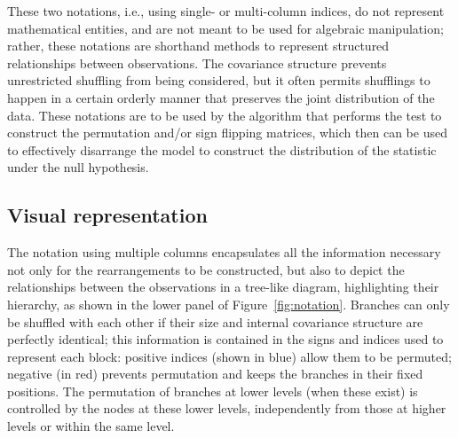 These two notations, i.e., using single- or multi-column indices, do not represent mathematical entities, and are not meant to be used for algebraic manipulation; rather, these notations are shorthand methods to represent structured relationships between observations. The covariance structure prevents unrestricted shuffling from being considered, but it often permits shufflings to happen in a certain orderly manner that preserves the joint distribution of the data. These notations are to be used by the algorithm that performs the test to construct the permutation and/or sign flipping matrices, which then can be used to effectively disarrange the model to construct the distribution of the statistic under the null hypothesis.

\subsection{Visual representation}

The notation using multiple columns encapsulates all the information necessary not only for the rearrangements to be constructed, but also to depict the relationships between the observations in a tree-like diagram, highlighting their hierarchy, as shown in the lower panel of Figure~\ref{fig:notation}. Branches can only be shuffled with each other if their size and internal covariance structure are perfectly identical; this information is contained in the signs and indices used to represent each block: positive indices (shown in blue) allow them to be permuted; negative (in red) prevents permutation and keeps the branches in their fixed positions. The permutation of branches at lower levels (when these exist) is controlled by the nodes at these lower levels, independently from those at higher levels or within the same level.

